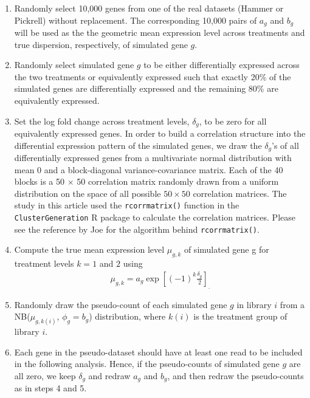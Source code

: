 \documentclass[10pt]{article}
\begin{document}
\begin{enumerate}
\item Randomly select 10,000 genes from one of the real datasets (Hammer or Pickrell) without replacement. The corresponding 10,000 pairs of $a_g$ and $b_g$ will be used as the the geometric mean expression level across treatments and true dispersion, respectively, of simulated gene $g$.
\item Randomly select simulated gene $g$ to be either differentially expressed %
across the two treatments or equivalently expressed %
 such that exactly 20\% of the simulated genes are differentially expressed %
 and the remaining 80\% are equivalently expressed. %
\item Set the log fold change across treatment levels, $\delta_g$, to be zero for all equivalently expressed %
 genes. In order to build a correlation structure into the differential expression pattern of the simulated genes, we draw the $\delta_g$'s of all differentially expressed %
 genes from a multivariate normal distribution with mean 0 and a block-diagonal variance-covariance matrix. Each of the 40 blocks is a 50 $\times$ 50 correlation matrix randomly drawn from a uniform distribution on the space of all possible $50 \times 50$ correlation matrices. The study in this article used the {\tt rcorrmatrix()} function in the {\tt ClusterGeneration} R package to calculate the correlation matrices. Please see the reference by Joe \cite{joe} for the algorithm behind {\tt rcorrmatrix()}.

\item Compute the true mean expression level $\mu_{g, k}$ of simulated gene g for treatment levels $k = 1$ and $2$ using
\begin{align*}
\mu_{g, k} = a_g \exp \left [ (-1)^k \frac{\delta_g}{2} \right ]_. %
\end{align*}
\item Randomly draw the pseudo-count of each simulated gene $g$ in library $i$ from a NB($\mu_{g, k(i)}$, ${\phi}_{g} = b_g$) distribution, where $k(i)$ is the treatment group of library $i$.
\item Each gene in the pseudo-dataset should have at least one read to be included in the following analysis. Hence, if the pseudo-counts of simulated gene $g$ are all zero, we keep $\delta_g$ and redraw $a_g$ and $b_g$, and then redraw the pseudo-counts as in steps 4 and 5.
\end{enumerate}
\end{document}
